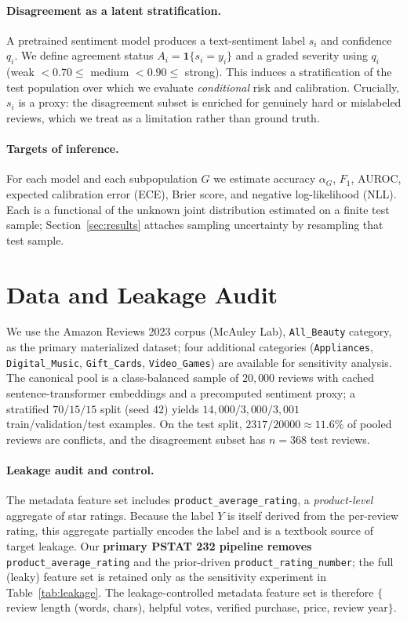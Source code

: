 \documentclass[11pt,a4paper]{article}
\begin{document}
\paragraph{Disagreement as a latent stratification.}
A pretrained sentiment model produces a text-sentiment label $s_i$ and confidence
$q_i$. We define agreement status $A_i = \mathbf{1}\{s_i = y_i\}$ and a graded
severity using $q_i$ (weak $<0.70 \leq$ medium $<0.90 \leq$ strong). This induces
a stratification of the test population over which we evaluate
\emph{conditional} risk and calibration. Crucially, $s_i$ is a proxy: the
disagreement subset is enriched for genuinely hard or mislabeled reviews, which
we treat as a limitation rather than ground truth.

\paragraph{Targets of inference.}
For each model and each subpopulation $G$ we estimate accuracy
$\alpha_G$, $F_1$, AUROC, expected calibration error (ECE), Brier score, and
negative log-likelihood (NLL). Each is a functional of the unknown joint
distribution estimated on a finite test sample; Section~\ref{sec:results}
attaches sampling uncertainty by resampling that test sample.

\section{Data and Leakage Audit}
\label{sec:data}

We use the Amazon Reviews 2023 corpus (McAuley Lab), \texttt{All\_Beauty}
category, as the primary materialized dataset; four additional categories
(\texttt{Appliances}, \texttt{Digital\_Music}, \texttt{Gift\_Cards},
\texttt{Video\_Games}) are available for sensitivity analysis. The canonical pool
is a class-balanced sample of $20{,}000$ reviews with cached sentence-transformer
embeddings and a precomputed sentiment proxy; a stratified $70/15/15$ split
(seed $42$) yields $14{,}000 / 3{,}000 / 3{,}001$ train/validation/test examples.
On the test split, $2317/20000 \approx 11.6\%$ of pooled reviews are conflicts,
and the disagreement subset has $n=368$ test reviews.

\paragraph{Leakage audit and control.}
The metadata feature set includes \texttt{product\_average\_rating},
a \emph{product-level} aggregate of star ratings. Because the label $Y$ is itself
derived from the per-review rating, this aggregate partially encodes the label
and is a textbook source of target leakage. Our \textbf{primary PSTAT 232
pipeline removes} \texttt{product\_average\_rating} and the prior-driven
\texttt{product\_rating\_number}; the full (leaky) feature set is retained only as
the sensitivity experiment in Table~\ref{tab:leakage}. The leakage-controlled
metadata feature set is therefore
$\{$review length (words, chars), helpful votes, verified purchase, price,
review year$\}$.
\end{document}
